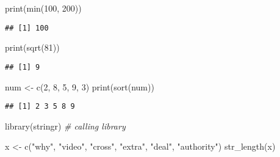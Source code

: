 \documentclass[
]{article}
\newenvironment{Shaded}{\begin{snugshade}}{\end{snugshade}}
\newcommand{\CommentTok}[1]{\textcolor[rgb]{0.56,0.35,0.01}{\textit{#1}}}
\newcommand{\DecValTok}[1]{\textcolor[rgb]{0.00,0.00,0.81}{#1}}
\newcommand{\FunctionTok}[1]{\textcolor[rgb]{0.00,0.00,0.00}{#1}}
\newcommand{\NormalTok}[1]{#1}
\newcommand{\OtherTok}[1]{\textcolor[rgb]{0.56,0.35,0.01}{#1}}
\newcommand{\StringTok}[1]{\textcolor[rgb]{0.31,0.60,0.02}{#1}}
\begin{document}
\begin{Shaded}
\begin{Highlighting}[]
\FunctionTok{print}\NormalTok{(}\FunctionTok{min}\NormalTok{(}\DecValTok{100}\NormalTok{, }\DecValTok{200}\NormalTok{))}
\end{Highlighting}
\end{Shaded}

\begin{verbatim}
## [1] 100
\end{verbatim}

\begin{Shaded}
\begin{Highlighting}[]
\FunctionTok{print}\NormalTok{(}\FunctionTok{sqrt}\NormalTok{(}\DecValTok{81}\NormalTok{))}
\end{Highlighting}
\end{Shaded}

\begin{verbatim}
## [1] 9
\end{verbatim}

\begin{Shaded}
\begin{Highlighting}[]
\NormalTok{num }\OtherTok{\textless{}{-}} \FunctionTok{c}\NormalTok{(}\DecValTok{2}\NormalTok{, }\DecValTok{8}\NormalTok{, }\DecValTok{5}\NormalTok{, }\DecValTok{9}\NormalTok{, }\DecValTok{3}\NormalTok{)}
\FunctionTok{print}\NormalTok{(}\FunctionTok{sort}\NormalTok{(num))}
\end{Highlighting}
\end{Shaded}

\begin{verbatim}
## [1] 2 3 5 8 9
\end{verbatim}

\begin{Shaded}
\begin{Highlighting}[]
\FunctionTok{library}\NormalTok{(stringr) }\CommentTok{\# calling library}
\end{Highlighting}
\end{Shaded}

\begin{Shaded}
\begin{Highlighting}[]
\NormalTok{x }\OtherTok{\textless{}{-}} \FunctionTok{c}\NormalTok{(}\StringTok{"why"}\NormalTok{, }\StringTok{"video"}\NormalTok{, }\StringTok{"cross"}\NormalTok{, }\StringTok{"extra"}\NormalTok{, }\StringTok{"deal"}\NormalTok{, }\StringTok{"authority"}\NormalTok{)}
\FunctionTok{str\_length}\NormalTok{(x)}
\end{Highlighting}
\end{Shaded}
\end{document}
